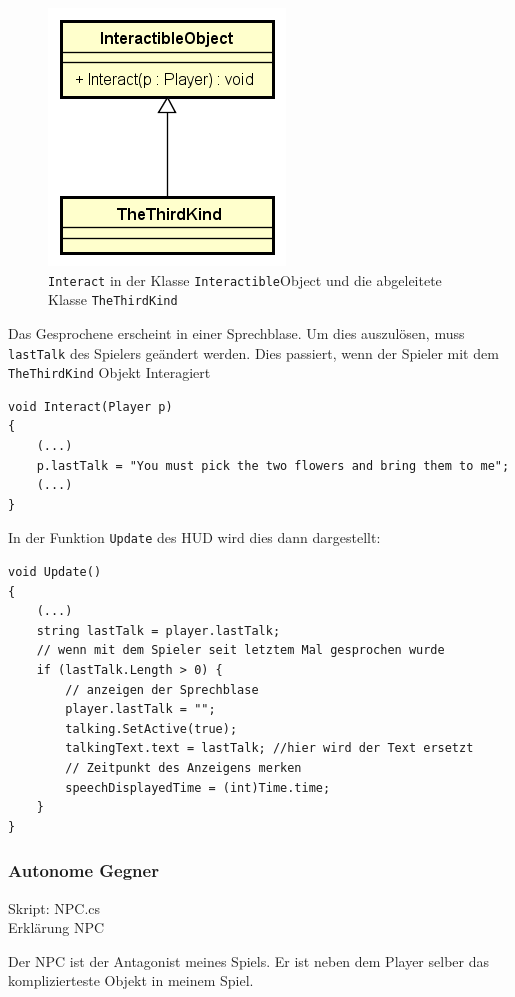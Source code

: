 \begin{figure}[H]
\includegraphics[scale=0.75]{diagramme/interactibleobject.png}
\caption{\lstinline{Interact} in der Klasse \lstinline{Interactible}Object und die abgeleitete Klasse \lstinline{TheThirdKind}}
\end{figure}

Das Gesprochene erscheint in einer Sprechblase. Um dies auszulösen, muss \lstinline{lastTalk} des Spielers geändert werden.
Dies passiert, wenn der Spieler mit dem \lstinline{TheThirdKind} Objekt Interagiert 
\begin{lstlisting}[caption={Setzen des Sprechinhaltes}]
void Interact(Player p)
{
	(...)
	p.lastTalk = "You must pick the two flowers and bring them to me";
	(...)
}
\end{lstlisting}

In der Funktion \lstinline{Update} des HUD wird dies dann dargestellt:
 
\begin{lstlisting}[caption={Gesprochenes aktualisieren}]
void Update()
{
	(...)
	string lastTalk = player.lastTalk;
	// wenn mit dem Spieler seit letztem Mal gesprochen wurde
	if (lastTalk.Length > 0) {
		// anzeigen der Sprechblase
		player.lastTalk = "";
		talking.SetActive(true);
		talkingText.text = lastTalk; //hier wird der Text ersetzt
		// Zeitpunkt des Anzeigens merken
		speechDisplayedTime = (int)Time.time;
	} 
}
\end{lstlisting}


\subsubsection{Autonome Gegner}
\label{subsubsec:npc}
Skript: NPC.cs\\
Erklärung NPC 

Der NPC ist der Antagonist meines Spiels.
Er ist neben dem Player selber das komplizierteste Objekt in meinem Spiel.

